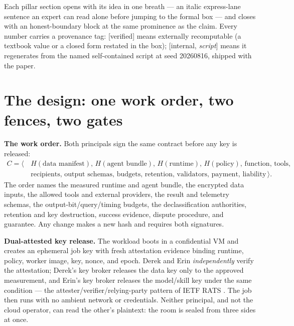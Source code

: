 \documentclass[11pt,a4paper]{article}
\begin{document}
Each pillar section opens with its idea in one breath --- an italic express-lane sentence an expert can read alone before jumping
to the formal box --- and closes with an honest-boundary block at the same prominence as the claim. Every number carries a
provenance tag: [verified] means externally recomputable (a textbook value or a closed form restated in the box); [internal,
\emph{script}] means it regenerates from the named self-contained script at seed 20260816, shipped with the paper.

\section{The design: one work order, two fences, two gates}\label{sec:design}

\textbf{The work order.} Both principals sign the same contract before any key is released:
\[
\begin{aligned}
C=\bigl\langle\, & H(\text{data manifest}),\,H(\text{agent
bundle}),\,H(\text{runtime}),\,H(\text{policy}),\,
\text{function},\,\text{tools},\\
& \text{recipients},\,\text{output
schemas},\,\text{budgets},\,\text{retention},\,\text{validators},\,\text{payment},\,\text{liability}\,\bigr\rangle.
\end{aligned}
\]
The order names the measured runtime and agent bundle, the encrypted data inputs, the allowed tools and external providers, the
result and telemetry schemas, the output-bit/query/timing budgets, the declassification authorities, retention and key
destruction, success evidence, dispute procedure, and guarantee. Any change makes a new hash and requires both signatures.

\textbf{Dual-attested key release.} The workload boots in a confidential VM and creates an ephemeral job key with fresh
attestation evidence binding runtime, policy, worker image, key, nonce, and epoch. Derek and Erin \emph{independently} verify the
attestation; Derek's key broker releases the data key only to the approved measurement, and Erin's key broker releases the
model/skill key under the same condition --- the attester/verifier/relying-party pattern of IETF RATS \cite{rats}. The job then
runs with no ambient network or credentials. Neither principal, and not the cloud operator, can read the other's plaintext: the
room is sealed from three sides at once.
\end{document}
